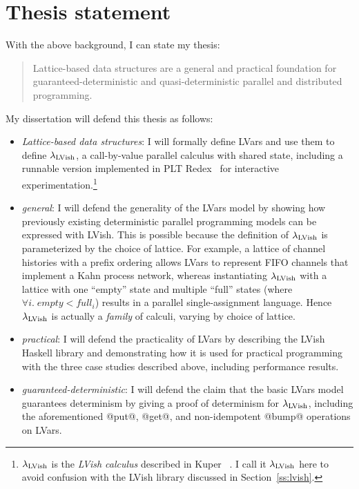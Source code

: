 \documentclass{article}
\begin{document}
\section{Thesis statement}\label{s:thesis}

With the above background, I can state my thesis:
\begin{quote}
  Lattice-based data structures are a general and practical foundation
  for guaranteed-deterministic and quasi-deterministic parallel and
  distributed programming.
\end{quote}
My dissertation will defend this thesis as follows:
\begin{itemize}
  \item \emph{Lattice-based data structures}: I will formally define
    LVars and use them to define $\lambda_{\textrm{LVish}}$, a call-by-value
    parallel calculus with shared state, including a runnable version
    implemented in PLT Redex~\cite{redex-book} for interactive
    experimentation.\footnote{$\lambda_{\textrm{LVish}}$ is the \emph{LVish
        calculus} described in Kuper \etal~\cite{Freeze-paper}.  I
      call it $\lambda_{\textrm{LVish}}$ here to avoid confusion with the LVish
      library discussed in Section~\ref{ss:lvish}.}

  \item \emph{general}: I will defend the generality of the LVars
    model by showing how previously existing deterministic parallel
    programming models can be expressed with LVish.  This is possible
    because the definition of $\lambda_{\textrm{LVish}}$ is parameterized by the
    choice of lattice.  For example, a lattice of channel histories
    with a prefix ordering allows LVars to represent FIFO channels
    that implement a Kahn process network, whereas instantiating
    $\lambda_{\textrm{LVish}}$ with a lattice with one ``empty'' state and
    multiple ``full'' states (where $\forall{i}.\; \mathit{empty} <
    \mathit{full_i}$) results in a parallel single-assignment
    language.  Hence $\lambda_{\textrm{LVish}}$ is actually a \emph{family} of
    calculi, varying by choice of lattice.

  \item \emph{practical}: I will defend the practicality of LVars by
    describing the LVish Haskell library and demonstrating how it is
    used for practical programming with the three case studies
    described above, including performance results.

  \item \emph{guaranteed-deterministic}: I will defend the claim that
    the basic LVars model guarantees determinism by giving a proof of
    determinism for $\lambda_{\textrm{LVish}}$, including the aforementioned
    @put@, @get@, and non-idempotent @bump@ operations on LVars.


\end{itemize}
\end{document}
